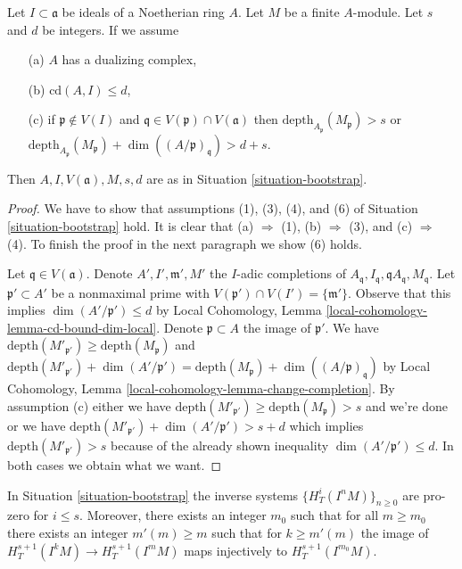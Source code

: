 \begin{lemma}
\label{lemma-bootstrap-bis-bis}
Let $I \subset \mathfrak a$ be ideals of a Noetherian ring $A$.
Let $M$ be a finite $A$-module. Let $s$ and $d$ be integers.
If we assume
\begin{enumerate}
\item[(a)] $A$ has a dualizing complex,
\item[(b)] $\text{cd}(A, I) \leq d$,
\item[(c)] if $\mathfrak p \not \in V(I)$ and
$\mathfrak q \in V(\mathfrak p) \cap V(\mathfrak a)$ then
$\text{depth}_{A_\mathfrak p}(M_\mathfrak p) > s$ or
$\text{depth}_{A_\mathfrak p}(M_\mathfrak p) +
\dim((A/\mathfrak p)_\mathfrak q) > d + s$.
\end{enumerate}
Then $A, I, V(\mathfrak a), M, s, d$ are as in
Situation \ref{situation-bootstrap}.
\end{lemma}

\begin{proof}
We have to show that assumptions (1), (3), (4), and (6) of
Situation \ref{situation-bootstrap} hold.
It is clear that (a) $\Rightarrow$ (1),
(b) $\Rightarrow$ (3), and (c) $\Rightarrow$ (4).
To finish the proof in the next paragraph we show (6) holds.

\medskip\noindent
Let $\mathfrak q \in V(\mathfrak a)$.
Denote $A', I', \mathfrak m', M'$
the $I$-adic completions of
$A_\mathfrak q, I_\mathfrak q, \mathfrak qA_\mathfrak q, M_\mathfrak q$.
Let $\mathfrak p' \subset A'$ be a nonmaximal prime with
$V(\mathfrak p') \cap V(I') = \{\mathfrak m'\}$.
Observe that this implies $\dim(A'/\mathfrak p') \leq d$
by Local Cohomology, Lemma \ref{local-cohomology-lemma-cd-bound-dim-local}.
Denote $\mathfrak p \subset A$ the image of $\mathfrak p'$.
We have
$\text{depth}(M'_{\mathfrak p'}) \geq \text{depth}(M_\mathfrak p)$ and
$\text{depth}(M'_{\mathfrak p'}) +
\dim(A'/\mathfrak p') =
\text{depth}(M_\mathfrak p) +
\dim((A/\mathfrak p)_\mathfrak q)$
by Local Cohomology, Lemma \ref{local-cohomology-lemma-change-completion}.
By assumption (c) either we have
$\text{depth}(M'_{\mathfrak p'}) \geq \text{depth}(M_\mathfrak p) > s$
and we're done or we have
$\text{depth}(M'_{\mathfrak p'}) +
\dim(A'/\mathfrak p') > s + d$ which implies
$\text{depth}(M'_{\mathfrak p'}) > s$ because of the already shown
inequality $\dim(A'/\mathfrak p') \leq d$. In both cases we
obtain what we want.
\end{proof}

\begin{lemma}
\label{lemma-bootstrap}
In Situation \ref{situation-bootstrap} the inverse systems
$\{H^i_T(I^nM)\}_{n \geq 0}$ are pro-zero for $i \leq s$.
Moreover, there exists an integer $m_0$ such that for all
$m \geq m_0$ there exists an integer $m'(m) \geq m$ such that for
$k \geq m'(m)$ the image of
$H^{s + 1}_T(I^kM) \to H^{s + 1}_T(I^mM)$
maps injectively to $H^{s + 1}_T(I^{m_0}M)$.
\end{lemma}

